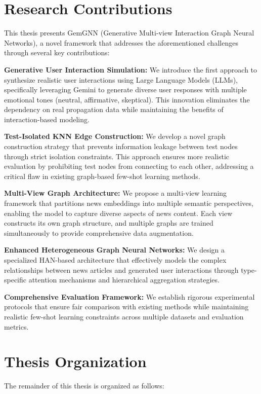 \section{Research Contributions}

This thesis presents GemGNN (Generative Multi-view Interaction Graph Neural Networks), a novel framework that addresses the aforementioned challenges through several key contributions:

\textbf{Generative User Interaction Simulation:} We introduce the first approach to synthesize realistic user interactions using Large Language Models (LLMs), specifically leveraging Gemini to generate diverse user responses with multiple emotional tones (neutral, affirmative, skeptical). This innovation eliminates the dependency on real propagation data while maintaining the benefits of interaction-based modeling.

\textbf{Test-Isolated KNN Edge Construction:} We develop a novel graph construction strategy that prevents information leakage between test nodes through strict isolation constraints. This approach ensures more realistic evaluation by prohibiting test nodes from connecting to each other, addressing a critical flaw in existing graph-based few-shot learning methods.

\textbf{Multi-View Graph Architecture:} We propose a multi-view learning framework that partitions news embeddings into multiple semantic perspectives, enabling the model to capture diverse aspects of news content. Each view constructs its own graph structure, and multiple graphs are trained simultaneously to provide comprehensive data augmentation.

\textbf{Enhanced Heterogeneous Graph Neural Networks:} We design a specialized HAN-based architecture that effectively models the complex relationships between news articles and generated user interactions through type-specific attention mechanisms and hierarchical aggregation strategies.

\textbf{Comprehensive Evaluation Framework:} We establish rigorous experimental protocols that ensure fair comparison with existing methods while maintaining realistic few-shot learning constraints across multiple datasets and evaluation metrics.

\section{Thesis Organization}

The remainder of this thesis is organized as follows:

